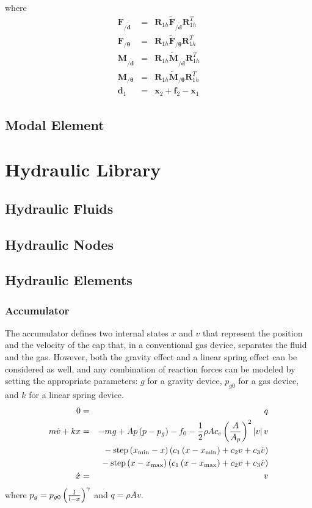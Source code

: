 \documentclass[10pt,dvips,fleqn]{report}
\newcommand{\T}[1]{\boldsymbol{#1}}
\begin{document}
where 
\begin{eqnarray*}
	\T{F}_{/\tilde{\T{d}}} & = & \T{R}_{1h} \tilde{\T{F}}_{/\tilde{\T{d}}} \T{R}_{1h}^T \\
	\T{F}_{/\T{\theta}} & = & \T{R}_{1h} \tilde{\T{F}}_{/\T{\theta}} \T{R}_{1h}^T \\
	\T{M}_{/\tilde{\T{d}}} & = & \T{R}_{1h} \tilde{\T{M}}_{/\tilde{\T{d}}} \T{R}_{1h}^T \\
	\T{M}_{/\T{\theta}} & = & \T{R}_{1h} \tilde{\T{M}}_{/\T{\theta}} \T{R}_{1h}^T \\
	\T{d}_1 & = & \T{x}_2 + \T{f}_2 - \T{x}_1
\end{eqnarray*}


\section{Modal Element}



\chapter{Hydraulic Library}
\section{Hydraulic Fluids}
\section{Hydraulic Nodes}

\section{Hydraulic Elements}

\subsection{Accumulator}
The accumulator defines two internal states $x$ and $v$ that represent 
the position and the velocity of the cap that, in a conventional
gas device, separates the fluid and the gas.
However, both the gravity effect and a linear spring effect
can be considered as well, and any combination of reaction forces
can be modeled by setting the appropriate parameters:
$g$ for a gravity device, $p_{g0}$ for a gas device, 
and $k$ for a linear spring device.
\begin{eqnarray*}
	0 & = & q \\
	m \dot{v} + k x & = & 
		- m g
		+ A p \left( p - p_g \right)
		- f_0 
		- \frac{1}{2} \rho A c_e \left( \frac{A}{A_p} \right)^2 \left| v \right| v \\
	& & \mbox{} - \mathrm{step}\left( x_{\mathrm{min}} - x \right)
		\left( c_1 \left( x - x_{\mathrm{min}} \right) + c_2 v + c_3 \dot{v} \right) \\
	& & \mbox{} - \mathrm{step}\left( x - x_{\mathrm{max}} \right)
		\left( c_1 \left( x - x_{\mathrm{max}} \right) + c_2 v + c_3 \dot{v} \right) \\
	\dot{x} & = & v
\end{eqnarray*}
where $p_g=p_{g0}\left( \frac{l}{l - x} \right)^{\gamma}$ and $q=\rho A v$.
\end{document}
